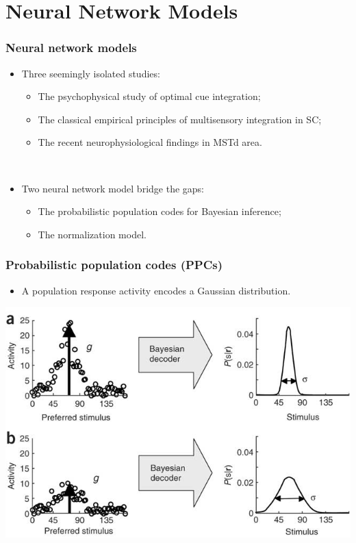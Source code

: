\documentclass{beamer}
\begin{document}
\section{Neural Network Models}

\begin{frame}
  \frametitle{Neural network models}
  \begin{itemize}
    \item Three seemingly isolated studies:
    \begin{itemize}
      \item The psychophysical study of optimal cue integration;
      \item The classical empirical principles of multisensory integration in SC;
      \item The recent neurophysiological findings in MSTd area.
    \end{itemize}

    ~
    \item Two neural network model bridge the gaps:
    \begin{itemize}
      \item The probabilistic population codes for Bayesian inference;
      \item The normalization model.
    \end{itemize}
  \end{itemize}
\end{frame}

\begin{frame}
  \frametitle{Probabilistic population codes (PPCs) \cite{ma_bayesian_2006}}
  \begin{itemize}
    \item A population response activity encodes a Gaussian distribution.
  \end{itemize}
  \begin{center}
    \includegraphics[width=.8\textwidth]{decoder}
  \end{center}
\end{frame}
\end{document}
